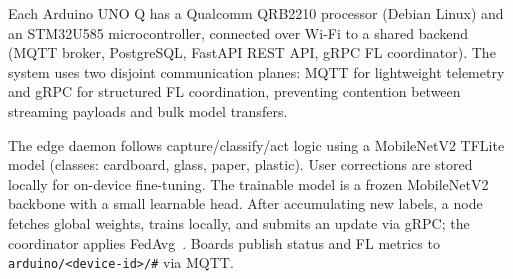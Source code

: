 Each Arduino UNO Q has a Qualcomm QRB2210 processor (Debian Linux) and an STM32U585 microcontroller, connected over Wi-Fi to a shared backend (MQTT broker, PostgreSQL, FastAPI REST API, gRPC FL coordinator). The system uses two disjoint communication planes: MQTT for lightweight telemetry and gRPC for structured FL coordination, preventing contention between streaming payloads and bulk model transfers. 

The edge daemon follows capture/classify/act logic using a MobileNetV2 TFLite model (classes: cardboard, glass, paper, plastic). User corrections are stored locally for on-device fine-tuning. The trainable model is a frozen MobileNetV2 backbone with a small learnable head. After accumulating new labels, a node fetches global weights, trains locally, and submits an update via gRPC; the coordinator applies FedAvg~\cite{mcmahan2017fedavg}. Boards publish status and FL metrics to \texttt{arduino/<device-id>/\#} via MQTT.
